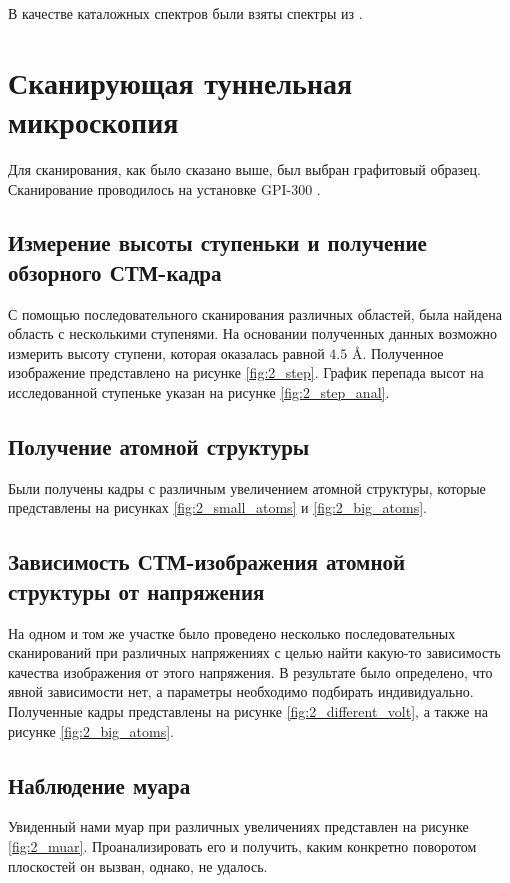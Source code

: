 \documentclass[a4paper, 12pt]{article}
\begin{document}
В качестве каталожных спектров были взяты спектры из \cite{Auger}.

\section{Сканирующая туннельная микроскопия}

Для сканирования, как было сказано выше, был выбран графитовый образец. Сканирование проводилось на установке GPI-300 \cite{STM}.

\subsection{Измерение высоты ступеньки и получение обзорного СТМ-кадра}

С помощью последовательного сканирования различных областей, была найдена область с несколькими ступенями. На основании полученных данных возможно измерить высоту ступени, которая оказалась равной $4.5$ \AA. Полученное изображение представлено на рисунке \ref{fig:2_step}. График перепада высот на исследованной ступеньке указан на рисунке \ref{fig:2_step_anal}.

\subsection{Получение атомной структуры}

Были получены кадры с различным увеличением атомной структуры, которые представлены на рисунках \ref{fig:2_small_atoms} и \ref{fig:2_big_atoms}.

\subsection{Зависимость СТМ-изображения атомной структуры от напряжения}

На одном и том же участке было проведено несколько последовательных сканирований при различных напряжениях с целью найти какую-то зависимость качества изображения от этого напряжения. В результате было определено, что явной зависимости нет, а параметры необходимо подбирать индивидуально. Полученные кадры представлены на рисунке \ref{fig:2_different_volt}, а также на рисунке \ref{fig:2_big_atoms}.

\subsection{Наблюдение муара}

Увиденный нами муар при различных увеличениях представлен на рисунке \ref{fig:2_muar}. Проанализировать его и получить, каким конкретно поворотом плоскостей он вызван, однако, не удалось.
\end{document}
